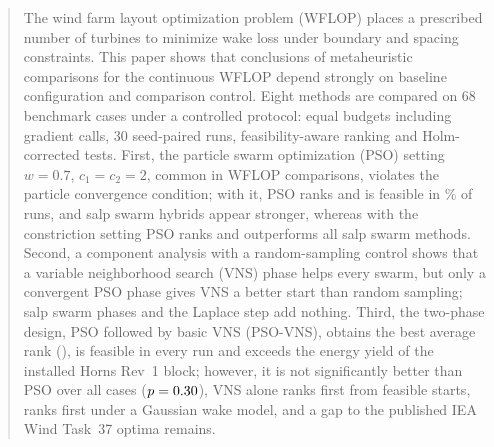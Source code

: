 \begin{abstract}
The wind farm layout optimization problem (WFLOP) places a prescribed number of turbines to minimize wake loss under boundary and spacing constraints. This paper shows that conclusions of metaheuristic comparisons for the continuous WFLOP depend strongly on baseline configuration and comparison control. Eight methods are compared on 68 benchmark cases under a controlled protocol: equal budgets including gradient calls, 30 seed-paired runs, feasibility-aware ranking and Holm-corrected tests. First, the particle swarm optimization (PSO) setting $w=0.7$, $c_1=c_2=2$, common in WFLOP comparisons, violates the particle convergence condition; with it, PSO ranks \NOldPSOPos{} and is feasible in \NOldPSOFeas\% of runs, and salp swarm hybrids appear stronger, whereas with the constriction setting PSO ranks \NPSOPos{} and outperforms all salp swarm methods. Second, a component analysis with a random-sampling control shows that a variable neighborhood search (VNS) phase helps every swarm, but only a convergent PSO phase gives VNS a better start than random sampling; salp swarm phases and the Laplace step add nothing. Third, the two-phase design, PSO followed by basic VNS (PSO-VNS), obtains the best average rank (\NRankPSOVNS), is feasible in every run and exceeds the energy yield of the installed Horns Rev~1 block; however, it is not significantly better than PSO over all cases ($p=\NPWPSO$), VNS alone ranks first from feasible starts, \NBestGauss{} ranks first under a Gaussian wake model, and a gap to the published IEA Wind Task~37 optima remains.
\end{abstract}

